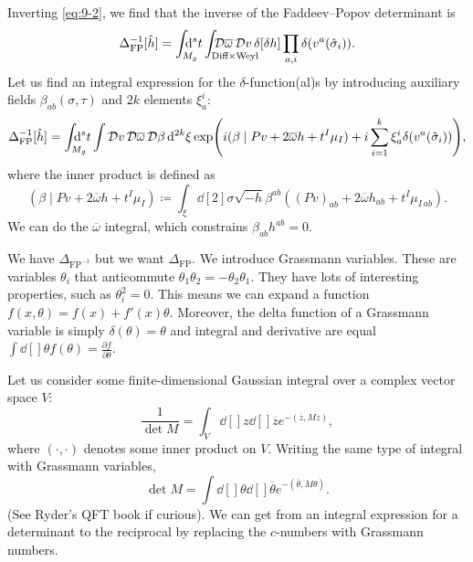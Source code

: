 Inverting \eqref{eq:9-2}, we find that the inverse of the Faddeev--Popov determinant is
\begin{equation}
  \Delta_{\text{FP}}^{-1}[\hat{h}] = \int_{\mathrlap{M_g}} \dd[s]{t} \int_{\mathrlap{\text{Diff} \times \text{Weyl}}} \pdd{\overline{\omega}{}} \pdd{v} \delta[\delta h ] \prod_{a, i} \delta(v^a(\hat{\sigma}_i)).
\end{equation}
Let us find an integral expression for the $\delta$-function(al)s by introducing auxiliary fields $\beta_{ab}(\sigma, \tau)$ and $2k$ elements $\xi^i_a$:
\begin{equation}
  \Delta^{-1}_{\text{FP}}[\hat{h}] =\int_{\mathrlap{M_g}} \dd[s]{t} \int \pdd{v} \pdd{\overline{\omega}{}} \pdd{\beta} \dd[2k]{{\xi}} \exp(i (\beta \mid Pv + 2 \overline{\omega}{} h + t^I \mu_I) + i \sum_{i=1}^{k} \xi^i_a \delta(v^a(\hat{\sigma}_i))),
\end{equation}
where the inner product is defined as
\begin{equation}
  (\beta \mid Pv + 2 \overline{\omega}{} h + t^I \mu_I) \coloneqq \int_\xi \dd[2]{\sigma} \sqrt{-h} \beta^{ab} ((Pv)_{ab} + 2 \overline{\omega}{} h_{ab} + t^I \mu_{I\, ab}).
\end{equation}
We can do the $\overline{\omega}{}$ integral, which constrains $\beta_{ab} h^{ab} = 0$.

\begin{leftbar}
  We have $\Delta_{\text{FP}^{-1}}$ but we want $\Delta_{\text{FP}}$.
  We introduce Grassmann variables. These are variables $\theta_i$ that anticommute $\theta_1 \theta_2 = - \theta_2 \theta_1$. They have lots of interesting properties, such as $\theta^2_i = 0$.
  This means we can expand a function $f(x, \theta) = f(x) + f'(x) \theta$. 
  Moreover, the delta function of a Grassmann variable is simply $\delta(\theta) = \theta$ and integral and derivative are equal $\int \dd[]{\theta} f(\theta) = \frac{\partial f}{\partial \theta}$.
\end{leftbar}

Let us consider some finite-dimensional Gaussian integral over a complex vector space $V$:
\begin{equation}
  \frac{1}{\det M} = \int_V \dd[]{z} \dd[]{\overline{z}{}} e^{-(\overline{z}{}, Mz)},
\end{equation}
where $(\cdot, \cdot)$ denotes some inner product on $V$.
Writing the same type of integral with Grassmann variables, 
\begin{equation}
  \det M = \int \dd[]{\theta} \dd[]{\overline{\theta}{}} e^{-(\overline{\theta}{}, M \theta)}.
\end{equation}
(See Ryder's QFT book if curious).
We can get from an integral expression for a determinant to the reciprocal by replacing the $c$-numbers with Grassmann numbers.

